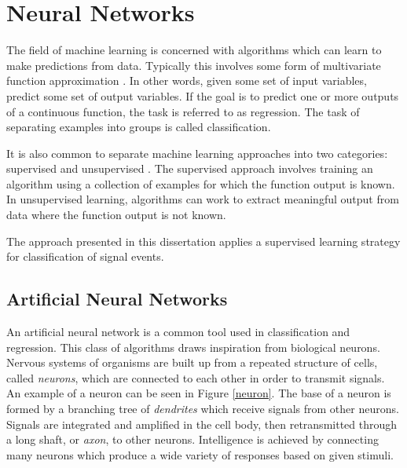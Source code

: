 \chapter{Neural Networks}
\label{nnet_chapter}

The field of machine learning is concerned with algorithms which can learn to make predictions from data.  Typically this involves some form of multivariate function approximation \cite{reed1999neural}.
In other words, given some set of input variables, predict some set of output variables.  If the goal is to predict one or more outputs of a continuous function, the task is referred to as regression.  The task of separating examples into groups is called classification.

It is also common to separate machine learning approaches into two categories: supervised and unsupervised \cite{lecun2015deep}.
The supervised approach involves training an algorithm using a collection of examples for which the function output is known.  In unsupervised learning, algorithms can work to extract meaningful output from data where the function output is not known.

The approach presented in this dissertation applies a supervised learning
strategy for classification of signal events.



\section{Artificial Neural Networks}

An artificial neural network is a common tool used in classification and regression.  This class of algorithms draws inspiration from biological neurons.  Nervous systems of organisms are built up from a repeated structure of cells, called \textit{neurons}, which are connected to each other in order to transmit signals.  An example of a neuron can be seen in Figure \ref{neuron}.  The base of a neuron is formed by a branching tree of \textit{dendrites} which receive signals from other neurons.  Signals are integrated and amplified in the cell body, then retransmitted through a long shaft, or \textit{axon}, to other neurons.  Intelligence is achieved by connecting many neurons which produce a wide variety of responses based on given stimuli.


